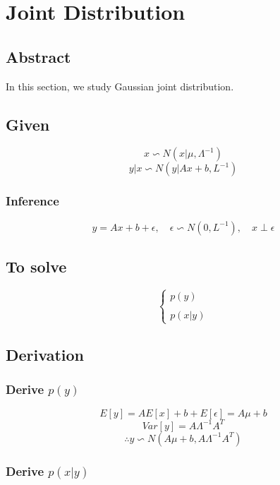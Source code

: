 \documentclass{report}
\begin{document}
\section{Joint Distribution}
\subsection{Abstract}
In this section, we study Gaussian joint distribution.
\subsection{Given}
$$
x \backsim N(x|\mu, \Lambda^{-1})
$$
$$
y|x \backsim N(y|Ax+b, L^{-1})
$$
\subsubsection{Inference}
$$
y = Ax+b+\epsilon, \quad \epsilon \backsim N(0, L^{-1}), \quad x \perp \epsilon
$$
\subsection{To solve}
$$
\begin{cases}
p(y)\\
\\
p(x|y)
\end{cases}
$$
\subsection{Derivation}
\subsubsection{Derive $p(y)$}

$$
E[y] = A E[x] + b + E[\epsilon]=A \mu + b
$$
$$
Var[y] = A \Lambda^{-1} A^T
$$
$$
\therefore y \backsim N(A\mu +b, A\Lambda^{-1} A^T)
$$
\subsubsection{Derive $p(x|y)$}
\end{document}

